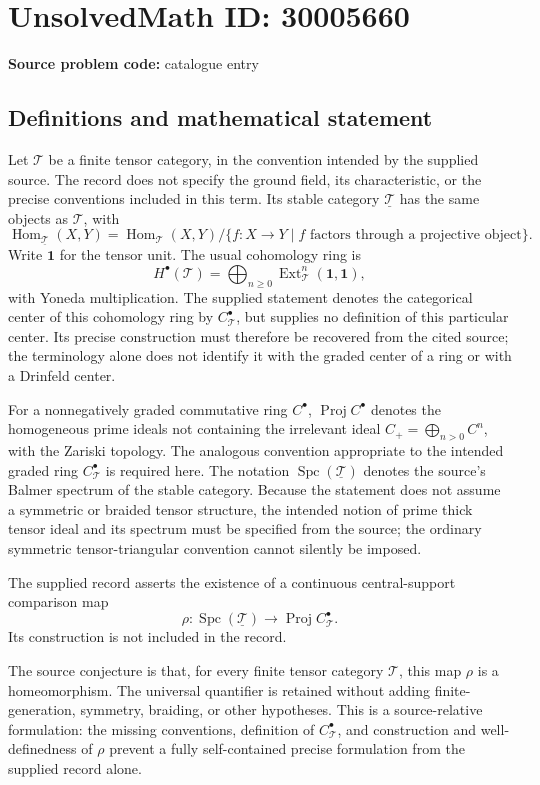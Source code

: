 \documentclass[11pt]{article}
\begin{document}
\section*{UnsolvedMath ID: 30005660}
\textbf{Source problem code:} catalogue entry
\subsection{Definitions and mathematical statement}
Let \(\mathcal T\) be a finite tensor category, in the convention intended by the supplied source. The record does not specify the ground field, its characteristic, or the precise conventions included in this term. Its stable category \(\underline{\mathcal T}\) has the same objects as \(\mathcal T\), with
\[
\operatorname{Hom}_{\underline{\mathcal T}}(X,Y)
=
\operatorname{Hom}_{\mathcal T}(X,Y)\big/
\{f:X\to Y\mid f\text{ factors through a projective object}\}.
\]
Write \(\mathbf 1\) for the tensor unit. The usual cohomology ring is
\[
H^\bullet(\mathcal T)=\bigoplus_{n\geq 0}\operatorname{Ext}_{\mathcal T}^{n}(\mathbf 1,\mathbf 1),
\]
with Yoneda multiplication. The supplied statement denotes the categorical center of this cohomology ring by \(C_{\mathcal T}^{\bullet}\), but supplies no definition of this particular center. Its precise construction must therefore be recovered from the cited source; the terminology alone does not identify it with the graded center of a ring or with a Drinfeld center.

For a nonnegatively graded commutative ring \(C^\bullet\), \(\operatorname{Proj}C^\bullet\) denotes the homogeneous prime ideals not containing the irrelevant ideal \(C_+=\bigoplus_{n>0}C^n\), with the Zariski topology. The analogous convention appropriate to the intended graded ring \(C_{\mathcal T}^{\bullet}\) is required here. The notation \(\operatorname{Spc}(\underline{\mathcal T})\) denotes the source's Balmer spectrum of the stable category. Because the statement does not assume a symmetric or braided tensor structure, the intended notion of prime thick tensor ideal and its spectrum must be specified from the source; the ordinary symmetric tensor-triangular convention cannot silently be imposed.

The supplied record asserts the existence of a continuous central-support comparison map
\[
\rho:\operatorname{Spc}(\underline{\mathcal T})\longrightarrow\operatorname{Proj}C_{\mathcal T}^{\bullet}.
\]
Its construction is not included in the record.

The source conjecture is that, for every finite tensor category \(\mathcal T\), this map \(\rho\) is a homeomorphism. The universal quantifier is retained without adding finite-generation, symmetry, braiding, or other hypotheses. This is a source-relative formulation: the missing conventions, definition of \(C_{\mathcal T}^{\bullet}\), and construction and well-definedness of \(\rho\) prevent a fully self-contained precise formulation from the supplied record alone.
\end{document}
